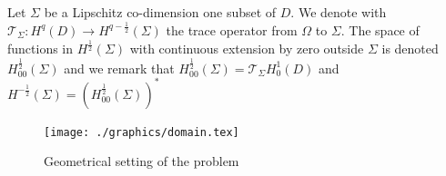 \documentclass[r]{siamart171218}
\begin{document}
Let $\Sigma$ be a Lipschitz co-dimension one subset of $D$. We denote with $\mathcal{T}_\Sigma: H^q(D) \rightarrow H^{q-\frac 1 2}(\Sigma)$ the trace operator from $\Omega$ to $\Sigma$.
The space of functions in $H^{\frac 1 2}(\Sigma)$ with continuous extension by zero outside $\Sigma$ is denoted 
$H^{\frac 1 2}_{00}(\Sigma)$ and we remark that 
$H^{\frac 1 2}_{00}(\Sigma) = \mathcal{T}_\Sigma H^1_0(D)$
and  $H^{-\frac 1 2}(\Sigma) = (H^{\frac 1 2}_{00}(\Sigma))^*$

\begin{figure}[t!]
\begin{center}
\texttt{[image: ./graphics/domain.tex]}
\end{center}
\caption{Geometrical setting of the problem}
\label{fig1}
\end{figure}
\end{document}
